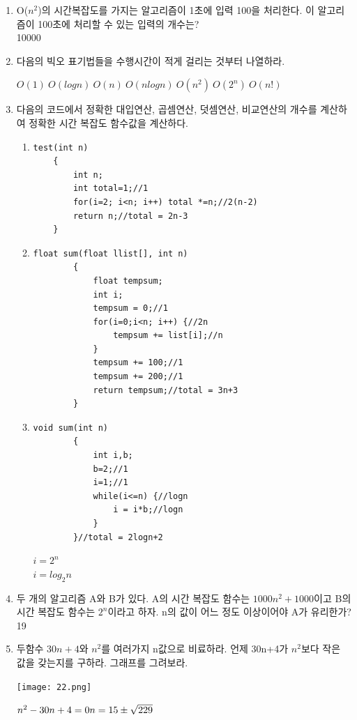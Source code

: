 \documentclass[11pt,a4paper]{article}
\begin{document}
\begin{enumerate}
\item O($n^2$)의 시간복잡도를 가지는 알고리즘이 1초에 입력 100을 처리한다. 이 알고리즘이 100초에 처리할 수 있는 입력의 개수는?\\
10000

\item 다음의 빅오 표기법들을 수행시간이 적게 걸리는 것부터 나열하라.

	$O(1)\ O(logn)\ O(n)\ O(nlogn)\ O(n^2)\ O(2^n)\ O(n!)$
	
\item 다음의 코드에서 정확한 대입연산, 곱셈연산, 덧셈연산, 비교연산의 개수를 계산하여 정확한 시간 복잡도 함수값을 계산하다.
\begin{enumerate}
	\item
	\begin{lstlisting}[frame=none] 
	test(int n)
	{
		int n;
		int total=1;//1
		for(i=2; i<n; i++) total *=n;//2(n-2)
		return n;//total = 2n-3
	}
	\end{lstlisting}
	
	\item
	\begin{lstlisting}[frame=none]
		float sum(float llist[], int n)
		{
			float tempsum;
			int i;
			tempsum = 0;//1
			for(i=0;i<n; i++) {//2n
				tempsum += list[i];//n
			}
			tempsum += 100;//1
			tempsum += 200;//1
			return tempsum;//total = 3n+3
		}
	\end{lstlisting}
	
	\item
	\begin{lstlisting}[frame=none]
		void sum(int n)
		{
			int i,b;
			b=2;//1
			i=1;//1
			while(i<=n) {//logn
				i = i*b;//logn
			}
		}//total = 2logn+2
	\end{lstlisting}
	$i = 2^n$\\
	\therefore $i = log_2n$ 
\end{enumerate}
\item 두 개의 알고리즘 A와 B가 있다. A의 시간 복잡도 함수는 $1000n^2+1000$이고 B의 시간 복잡도 함수는 $2^n$이라고 하자. n의 값이 어느 정도 이상이어야 A가 유리한가? 19

\item 두함수 $30n+4$와 $n^2$를 여러가지 n값으로 비료하라. 언제 30n+4가 $n^2$보다 작은 값을 갖는지를 구하라. 그래프를 그려보라.

\texttt{[image: 22.png]}

$n^2-30n+4=0\\n=15\pm\sqrt{229}$
\end{enumerate}
\end{document}
